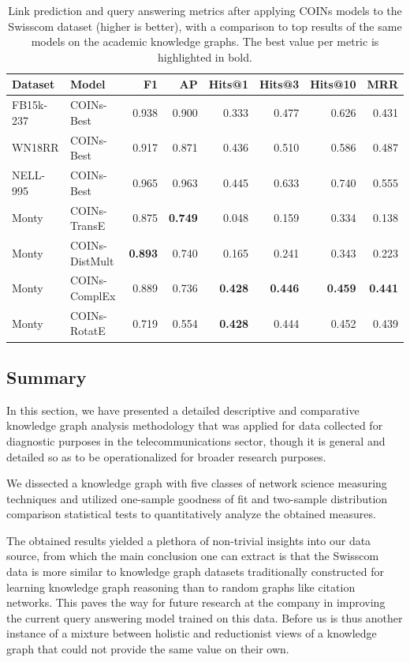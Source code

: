 \begin{table}[!ht]
    \centering
    \caption[Link prediction and query answering metrics after applying COINs models to the Swisscom dataset.]{Link prediction and query answering metrics after applying COINs models to the Swisscom dataset (higher is better), with a comparison to top results of the same models on the academic knowledge graphs. The best value per metric is highlighted in bold.}
    \label{tab:swisscom_coins}
    \begin{tabular}{llrrrrrr}
    \toprule
         Dataset & Model & F1 & AP & Hits@1 & Hits@3 & Hits@10 & MRR \\
    \midrule
         FB15k-237 & COINs-Best & 0.938 & 0.900 & 0.333 & 0.477 & 0.626 & 0.431 \\
         WN18RR & COINs-Best & 0.917 & 0.871 & 0.436 & 0.510 & 0.586 & 0.487 \\
         NELL-995 & COINs-Best & 0.965 & 0.963 & 0.445 & 0.633 & 0.740 & 0.555 \\
         \midrule
         Monty & COINs-TransE & 0.875 & \textbf{0.749} & 0.048 & 0.159 & 0.334 & 0.138 \\
         Monty & COINs-DistMult & \textbf{0.893} & 0.740 & 0.165 & 0.241 & 0.343 & 0.223 \\
         Monty & COINs-ComplEx & 0.889 & 0.736 & \textbf{0.428} & \textbf{0.446} & \textbf{0.459} & \textbf{0.441} \\
         Monty & COINs-RotatE & 0.719 & 0.554 & \textbf{0.428} & 0.444 & 0.452 & 0.439 \\
    \bottomrule
    \end{tabular}
\end{table}

\subsection{Summary}
\label{sec:summary}

In this section, we have presented a detailed descriptive and comparative knowledge graph analysis methodology that was applied for data collected for diagnostic purposes in the telecommunications sector, though it is general and detailed so as to be operationalized for broader research purposes. 

We dissected a knowledge graph with five classes of network science measuring techniques and utilized one-sample goodness of fit and two-sample distribution comparison statistical tests to quantitatively analyze the obtained measures.

The obtained results yielded a plethora of non-trivial insights into our data source, from which the main conclusion one can extract is that the Swisscom data is more similar to knowledge graph datasets traditionally constructed for learning knowledge graph reasoning than to random graphs like citation networks. This paves the way for future research at the company in improving the current query answering model trained on this data. Before us is thus another instance of a mixture between holistic and reductionist views of a knowledge graph that could not provide the same value on their own.
